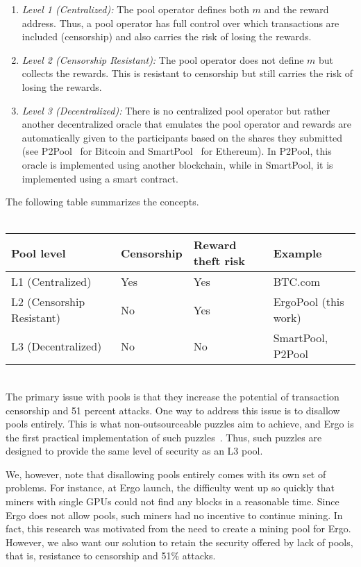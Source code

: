 \documentclass{llncs}
\begin{document}
\begin{enumerate}
	\item {\em Level 1 (Centralized):} The pool operator defines both $m$ and the reward address. Thus, a pool operator has full control over which transactions are included (censorship) and also carries the risk of losing the rewards.
	\item {\em Level 2 (Censorship Resistant):} The pool operator does not define $m$ but collects the rewards. This is resistant to censorship but still carries the risk of losing the rewards. %
	\item {\em Level 3 (Decentralized):} There is no centralized pool operator but rather another decentralized oracle that emulates the pool operator and rewards are automatically given to the participants based on the shares they submitted (see P2Pool~\cite{chesterman2018p2pool} for Bitcoin and SmartPool~\cite{luu2017smartpool} for Ethereum). In P2Pool, this oracle is implemented using another blockchain, while in SmartPool, it is implemented using a smart contract.
\end{enumerate}

The following table summarizes the concepts.\\~\\
	\begin{tabular}{|l|l|l|l|}\hline
	Pool level	& Censorship & Reward theft risk &Example\\\hline
	L1 (Centralized)	&Yes & Yes  & BTC.com\\
	L2 (Censorship Resistant)	& No & Yes &ErgoPool (this work)\\
	L3 (Decentralized)	& No & No &SmartPool\cite{luu2017smartpool}, P2Pool~\cite{chesterman2018p2pool}\\\hline
	\end{tabular}

~\\

The primary issue with pools is that they increase the potential of transaction censorship and 51 percent attacks. One way to address this issue is to disallow pools entirely. This is what non-outsourceable puzzles aim to achieve, and Ergo is the first practical implementation of such puzzles~\cite{ergo}. Thus, such puzzles are designed to provide the same level of security as an L3 pool.

We, however, note that disallowing pools entirely comes with its own set of problems. For instance, at Ergo launch, the difficulty went up so quickly that miners with single GPUs could not find any blocks in a reasonable time. Since Ergo does not allow pools, such miners had no incentive to continue mining. In fact, this research was motivated from the need to create a mining pool for Ergo. However, we also want our solution to retain the security offered by lack of pools, that is, resistance to censorship and 51\% attacks. 
\end{document}
